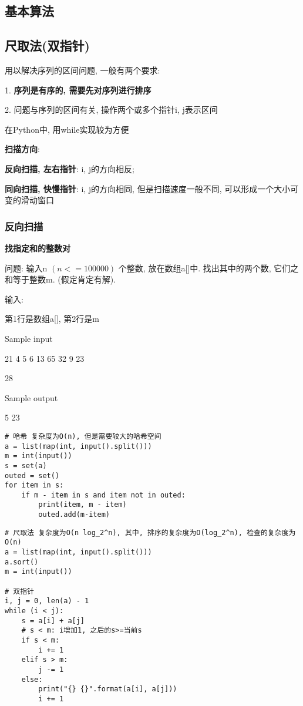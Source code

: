 \documentclass[../main]{subfiles}
\begin{document}
\begin{sloppy}
\section{基本算法}
\subsection{尺取法(双指针)}

用以解决序列的区间问题, 一般有两个要求:

1. \textbf{序列是有序的, 需要先对序列进行排序}

2. 问题与序列的区间有关, 操作两个或多个指针i, j表示区间

在Python中, 用while实现较为方便

\textbf{扫描方向}: 

\textbf{反向扫描, 左右指针}: i, j的方向相反; 

\textbf{同向扫描, 快慢指针}: i, j的方向相同, 但是扫描速度一般不同, 可以形成一个大小可变的滑动窗口

\subsubsection{反向扫描}

\textbf{找指定和的整数对}

问题: 输入n $(n <= 100000)$ 个整数, 放在数组a[]中. 找出其中的两个数, 它们之和等于整数m. (假定肯定有解).

输入:

第1行是数组a[], 第2行是m

Sample input

21 4 5 6 13 65 32 9 23

28

Sample output

5 23

\begin{lstlisting}[style = Python]
# 哈希 复杂度为O(n), 但是需要较大的哈希空间
a = list(map(int, input().split()))
m = int(input())
s = set(a)
outed = set()
for item in s:
    if m - item in s and item not in outed:
        print(item, m - item)
        outed.add(m-item)
\end{lstlisting}

\begin{lstlisting}[style = Python]
# 尺取法 复杂度为O(n log_2^n), 其中, 排序的复杂度为O(log_2^n), 检查的复杂度为O(n)
a = list(map(int, input().split()))
a.sort()
m = int(input())

# 双指针
i, j = 0, len(a) - 1
while (i < j):
    s = a[i] + a[j]
    # s < m: i增加1, 之后的s>=当前s
    if s < m:
        i += 1
    elif s > m:
        j -= 1
    else:
        print("{} {}".format(a[i], a[j]))
        i += 1
\end{lstlisting}


\end{sloppy}
\end{document}

